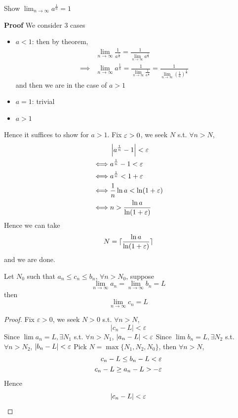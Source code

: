 \begin{example}
    Show $\lim_{n \to \infty} a^{ \frac{1}{n}} = 1$ 
    \medskip

    \textbf{Proof}
    We consider 3 cases
    \begin{itemize}
        \item $a < 1$: then by theorem,
        \begin{align*}
            &\lim_{n \to \infty} \frac{1}{a^{ \frac{1}{n}}}
            = \frac{1}{ \lim_{n \to \infty} a^{ \frac{1}{n}}} \\
            \implies & \lim_{n \to \infty} a^{ \frac{1}{n}} = 
            \frac{1}{\lim_{n \to \infty} \frac{1}{a^{ \frac{1}{n}}}}
            = \frac{1}{\lim_{n \to \infty} \left( \frac{1}{a} \right)^{ \frac{1}{n}} }
        \end{align*}
        and then we are in the case of $a > 1$
        \item $a = 1$: trivial
        \item $a > 1$
    \end{itemize} 

    Hence it suffices to show for $a > 1$. 
    Fix $\varepsilon > 0$, we seek $N$ s.t. $\forall n > N$,
    \begin{align*}
        & \left| a^{ \frac{1}{n}} - 1 \right| < \varepsilon \\
        \iff & a^{ \frac{1}{n}} - 1 < \varepsilon \\
        \iff & a^{ \frac{1}{n}}  < 1 + \varepsilon \\
        \iff & \frac{1}{n} \ln a < \ln( 1 + \varepsilon) \\
        \iff & n > \frac{ \ln a}{\ln ( 1 + \varepsilon)}
    \end{align*}
    Hence we can take 
    \[
        N = 
        \lceil
        \frac{\ln a}{\ln ( 1 + \varepsilon)}
        \rceil
    \]
    and we are done.
\end{example}


\begin{theorem}
    Let $N_0$ such that $a_n \leq c_n \leq b_n$,
    $\forall n > N_0$,
    suppose
    \[
        \lim_{n \to \infty} a_n =
        \lim_{n \to \infty} b_n = L
    \]
    then 
    \[
        \lim_{n \to \infty} c_n = L
    \]
\end{theorem}

\begin{proof}
    Fix $\varepsilon > 0$, we seek $N > 0$ s.t. $\forall n > N$,
    \[
        |c_n - L| < \varepsilon
    \]
    Since $\lim a_n = L, \exists N_1$ s.t. 
    $\forall n > N_1$,
    $|a_n - L | < \varepsilon$
    Since $\lim b_n = L, \exists N_2$ s.t. 
    $\forall n > N_2$,
    $|b_n - L | < \varepsilon$
    Pick $N = \max \{ N_1, N_2, N_0 \} $, 
    then $\forall n > N$,
    \begin{align*}
        c_n - L \leq b_n - L < \varepsilon \\
        c_n - L \geq a_n - L > -\varepsilon \\
    \end{align*}
    Hence 
    \[
        \left| c_n - L  \right|  < \varepsilon
    \]
    
\end{proof}


